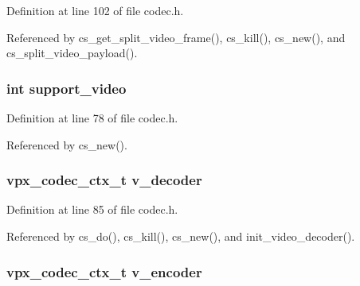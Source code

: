 Definition at line 102 of file codec.\+h.



Referenced by cs\+\_\+get\+\_\+split\+\_\+video\+\_\+frame(), cs\+\_\+kill(), cs\+\_\+new(), and cs\+\_\+split\+\_\+video\+\_\+payload().

\hypertarget{struct___c_s_session_a269c7451109b710b39367a8ef63afce9}{
\subsubsection[{support\+\_\+video}]{\setlength{\rightskip}{0pt plus 5cm}int support\+\_\+video}}\label{struct___c_s_session_a269c7451109b710b39367a8ef63afce9}


Definition at line 78 of file codec.\+h.



Referenced by cs\+\_\+new().

\hypertarget{struct___c_s_session_aa155f92243013193ef3fd9fd1b919bd0}{
\subsubsection[{v\+\_\+decoder}]{\setlength{\rightskip}{0pt plus 5cm}vpx\+\_\+codec\+\_\+ctx\+\_\+t v\+\_\+decoder}}\label{struct___c_s_session_aa155f92243013193ef3fd9fd1b919bd0}


Definition at line 85 of file codec.\+h.



Referenced by cs\+\_\+do(), cs\+\_\+kill(), cs\+\_\+new(), and init\+\_\+video\+\_\+decoder().

\hypertarget{struct___c_s_session_a0ec480a7314c0f185ae18f411d73b1bd}{
\subsubsection[{v\+\_\+encoder}]{\setlength{\rightskip}{0pt plus 5cm}vpx\+\_\+codec\+\_\+ctx\+\_\+t v\+\_\+encoder}}\label{struct___c_s_session_a0ec480a7314c0f185ae18f411d73b1bd}


